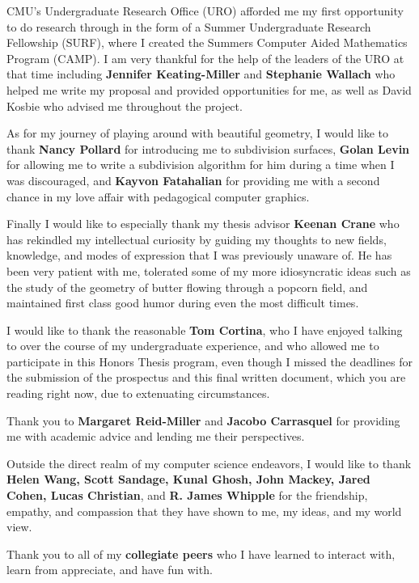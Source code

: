 \documentclass[12pt, letterpaper]{article}
\begin{document}
CMU's Undergraduate Research Office (URO) afforded me my first opportunity to do research through in the form of a
Summer Undergraduate Research Fellowship (SURF), where I created the Summers Computer Aided Mathematics Program (CAMP).
I am very thankful for the help of the leaders of the URO at that time including \textbf{Jennifer Keating-Miller} and \textbf{Stephanie Wallach}
who helped me write my proposal and provided opportunities for me, as well as David Kosbie who advised me throughout the project.

As for my journey of playing around with beautiful geometry, I would like to thank \textbf{Nancy Pollard} for introducing me to subdivision surfaces,
\textbf{Golan Levin} for allowing me to write a subdivision algorithm for him during a time when I was discouraged,
and \textbf{Kayvon Fatahalian} for providing me with a second chance in my love affair with pedagogical computer graphics.

Finally I would like to especially thank my thesis advisor \textbf{Keenan Crane} who has
rekindled my intellectual curiosity by guiding my thoughts to new fields, knowledge, and modes of expression that I was previously unaware of.
He has been very patient with me, tolerated some of my more idiosyncratic ideas such as the study of the geometry of butter flowing through a popcorn field,
and maintained first class good humor during even the most difficult times.

I would like to thank the reasonable \textbf{Tom Cortina}, who I have enjoyed talking to over the course of my undergraduate experience, and who allowed me to 
participate in this Honors Thesis program, even though I missed the deadlines for the submission of the prospectus and this final
written document, which you are reading right now, due to extenuating circumstances.

Thank you to \textbf{Margaret Reid-Miller} and \textbf{Jacobo Carrasquel} for providing me with academic advice and lending me their perspectives.

Outside the direct realm of my computer science endeavors, I would like to thank \textbf{Helen Wang,
	Scott Sandage, Kunal Ghosh, John Mackey, Jared Cohen, Lucas Christian},
and \textbf{R. James Whipple} for the friendship, empathy, and compassion that they have shown to me, my ideas, and my world view.

Thank you to all of my \textbf{collegiate peers} who I have learned to interact with, learn from appreciate, and have fun with.
\end{document}
